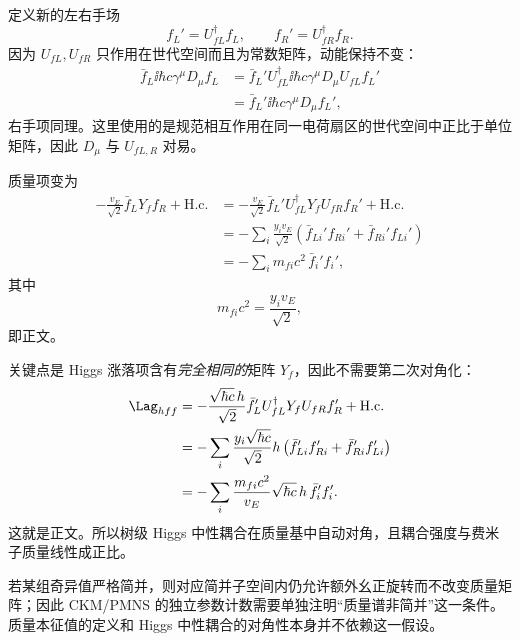 \begin{derivation}
定义新的左右手场
\begin{equation*}
 f_L'=U_{fL}^\dagger f_L,
 \qquad
 f_R'=U_{fR}^\dagger f_R.
\end{equation*}
因为 $U_{fL},U_{fR}$ 只作用在世代空间而且为常数矩阵，动能保持不变：
\begin{align*}
 \bar f_L\ii\hbar c\gamma^\mu D_\mu f_L
 &=\bar f_L'U_{fL}^\dagger
 \ii\hbar c\gamma^\mu D_\mu U_{fL}f_L'\\
 &=\bar f_L'\ii\hbar c\gamma^\mu D_\mu f_L',
\end{align*}
右手项同理。这里使用的是规范相互作用在同一电荷扇区的世代空间中正比于单位矩阵，因此 $D_\mu$ 与 $U_{fL,R}$ 对易。

质量项变为
\begin{align*}
 -\frac{v_E}{\sqrt2}\bar f_LY_ff_R+\mathrm{H.c.}
 &=-\frac{v_E}{\sqrt2}
 \bar f_L'U_{fL}^\dagger Y_fU_{fR}f_R'
 +\mathrm{H.c.}\\
 &=-\sum_i\frac{y_iv_E}{\sqrt2}
 \left(\bar f_{Li}'f_{Ri}'+\bar f_{Ri}'f_{Li}'\right)\\
 &=-\sum_i m_{fi}c^2\,\bar f_i'f_i',
\end{align*}
其中
\begin{equation*}
 \boxed{m_{fi}c^2=\frac{y_iv_E}{\sqrt2}},
\end{equation*}
即正文。

关键点是 Higgs 涨落项含有\emph{完全相同的}矩阵 $Y_f$，因此不需要第二次对角化：
\begin{align*}
 \Lag_{hff}
 &=-\frac{\sqrt{\hbar c}\,h}{\sqrt2}
 \bar f_L'U_{fL}^\dagger Y_fU_{fR}f_R'
 +\mathrm{H.c.}\\
 &=-\sum_i
 \frac{y_i\sqrt{\hbar c}}{\sqrt2}
 h\left(\bar f_{Li}'f_{Ri}'+\bar f_{Ri}'f_{Li}'\right)\\
 &=-\sum_i
 \frac{m_{fi}c^2}{v_E}\sqrt{\hbar c}\,
 h\,\bar f_i'f_i'.
\end{align*}
这就是正文。所以树级 Higgs 中性耦合在质量基中自动对角，且耦合强度与费米子质量线性成正比。

若某组奇异值严格简并，则对应简并子空间内仍允许额外幺正旋转而不改变质量矩阵；因此 CKM/PMNS 的独立参数计数需要单独注明“质量谱非简并”这一条件。质量本征值的定义和 Higgs 中性耦合的对角性本身并不依赖这一假设。
\end{derivation}


